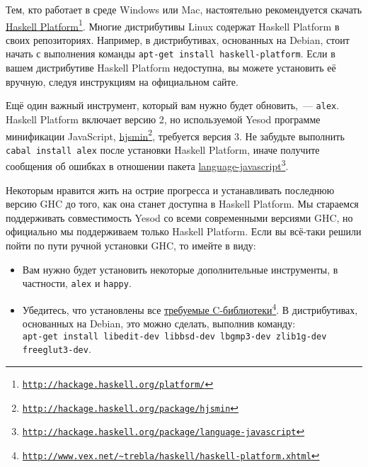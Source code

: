 Тем, кто работает в среде Windows или Mac, настоятельно рекомендуется скачать \href{http://hackage.haskell.org/platform/}{Haskell Platform}\footnote{\href{http://hackage.haskell.org/platform/}{\texttt{http://hackage.haskell.org/platform/}}}. Многие дистрибутивы Linux содержат Haskell Platform в своих репозиториях. Например, в дистрибутивах, основанных на Debian, стоит начать с выполнения команды \texttt{apt-get install haskell-platform}. Если в вашем дистрибутиве Haskell Platform недоступна, вы можете установить её вручную, следуя инструкциям на официальном сайте.

Ещё один важный инструмент, который вам нужно будет обновить,~--- \texttt{alex}. Haskell Platform включает версию 2, но используемой Yesod программе минификации JavaScript, \href{http://hackage.haskell.org/package/hjsmin}{hjsmin}\footnote{\href{http://hackage.haskell.org/package/hjsmin}{\texttt{http://hackage.haskell.org/package/hjsmin}}}, требуется версия 3. Не забудьте выполнить \texttt{cabal install alex} после установки Haskell Platform, иначе получите сообщения об ошибках в отношении пакета \href{http://hackage.haskell.org/package/language-javascript}{language-javascript}\footnote{\href{http://hackage.haskell.org/package/language-javascript}{\texttt{http://hackage.haskell.org/package/language-javascript}}}.

\begin{remark}
Некоторым нравится жить на острие прогресса и устанавливать последнюю версию GHC до того, как она станет доступна в Haskell Platform. Мы стараемся поддерживать совместимость Yesod со всеми современными версиями GHC, но официально мы поддерживаем только Haskell Platform. Если вы всё-таки решили пойти по пути ручной установки GHC, то имейте в виду:

\begin{itemize}
  \item Вам нужно будет установить некоторые дополнительные инструменты, в частности, \texttt{alex} и \texttt{happy}.
  \item Убедитесь, что установлены все \href{http://www.vex.net/~trebla/haskell/haskell-platform.xhtml}{требуемые C-библиотеки}\footnote{\href{http://www.vex.net/~trebla/haskell/haskell-platform.xhtml}{\texttt{http://www.vex.net/\~{}trebla/haskell/haskell-platform.xhtml}}}. В дистрибутивах, основанных на Debian, это можно сделать, выполнив команду:\\
 \texttt{apt-get install libedit-dev libbsd-dev lbgmp3-dev zlib1g-dev freeglut3-dev}.
\end{itemize}
\end{remark}

